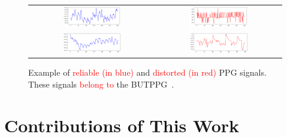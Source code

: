 \begin{figure}[h!]
    {
    \def\arraystretch{1}
    \setlength{\tabcolsep}{2pt}
    \begin{tabular}{cc}
        \includegraphics[width=0.48\textwidth, trim={1.5em 0 0em 0}, clip]{img/samples/butppg_111001.png} 
        & \includegraphics[width=0.48\textwidth, trim={1.5em 0 0em 0}, clip]{img/samples/butppg_111003.png} \\
        \includegraphics[width=0.49\textwidth, trim={1.5em 0 0em 0}, clip]{img/samples/butppg_111002.png} 
        & \includegraphics[width=0.49\textwidth, trim={1em 0 0em 0}, clip]{img/samples/butppg_111004.png} \\
    \end{tabular}
    }
    \caption{Example of \textcolor{red}{reliable (in blue)} and \textcolor{red}{distorted (in red)} \acrlong{PPG} signals. These signals \textcolor{red}{belong to} the \acrlong{BUTPPG}~\protect\cite{butppg}.}
    \label{fig:butppg_samples}
\end{figure}

\section{Contributions of This Work}
\label{sec:my_work}

